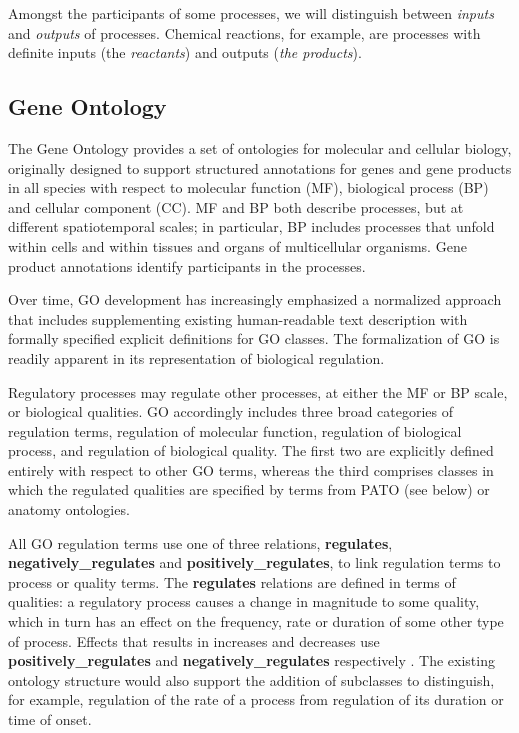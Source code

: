 \documentclass{bioinfo}
\renewcommand{\cite}{\citep}
\begin{document}
Amongst the participants of some processes, we will distinguish
between {\em inputs} and {\em outputs} of processes. Chemical
reactions, for example, are processes with definite inputs (the {\em
  reactants}) and outputs ({\em the products}).

\subsection{Gene Ontology}
The Gene Ontology provides a set of ontologies for molecular and
cellular biology, originally designed to support structured
annotations for genes and gene products in all species with respect to
molecular function (MF), biological process (BP) and cellular
component (CC). MF and BP both describe processes, but at different
spatiotemporal scales; in particular, BP includes processes that
unfold within cells and within tissues and organs of multicellular
organisms. Gene product annotations identify participants in the
processes.

Over time, GO development has increasingly emphasized a normalized
approach that includes supplementing existing human-readable text
description with formally specified explicit definitions for GO
classes. The formalization of GO is readily apparent in its
representation of biological regulation.

Regulatory processes may regulate other processes, at either the MF or
BP scale, or biological qualities. GO accordingly includes three broad
categories of regulation terms, regulation of molecular function,
regulation of biological process, and regulation of biological
quality. The first two are explicitly defined entirely with respect to
other GO terms, whereas the third comprises classes in which the
regulated qualities are specified by terms from PATO (see below) or
anatomy ontologies.

All GO regulation terms use one of three relations, {\bf regulates},
{\bf negatively\_regulates} and {\bf positively\_regulates}, to link
regulation terms to process or quality terms. The {\bf regulates}
relations are defined in terms of qualities: a regulatory process
causes a change in magnitude to some quality, which in turn has an
effect on the frequency, rate or duration of some other type of
process. Effects that results in increases and decreases use {\bf
  positively\_regulates} and {\bf negatively\_regulates} respectively
\cite{Mungall2010go}. The existing ontology structure would also
support the addition of subclasses to distinguish, for example,
regulation of the rate of a process from regulation of its duration or
time of onset.
\end{document}
